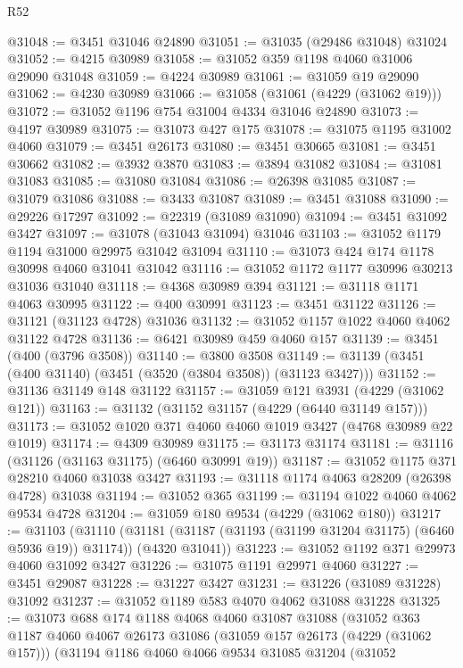 \begin{lexlean}{R52}
\begin{coremodule}
@31048 := @3451 @31046 @24890
@31051 := @31035 (@29486 @31048) @31024
@31052 := @4215 @30989
@31058 := @31052 @359 @1198 @4060 @31006 @29090 @31048
@31059 := @4224 @30989
@31061 := @31059 @19 @29090
@31062 := @4230 @30989
@31066 := @31058 (@31061 (@4229 (@31062 @19)))
@31072 := @31052 @1196 @754 @31004 @4334 @31046 @24890
@31073 := @4197 @30989
@31075 := @31073 @427 @175
@31078 := @31075 @1195 @31002 @4060
@31079 := @3451 @26173
@31080 := @3451 @30665
@31081 := @3451 @30662
@31082 := @3932 @3870
@31083 := @3894 @31082
@31084 := @31081 @31083
@31085 := @31080 @31084
@31086 := @26398 @31085
@31087 := @31079 @31086
@31088 := @3433 @31087
@31089 := @3451 @31088
@31090 := @29226 @17297
@31092 := @22319 (@31089 @31090)
@31094 := @3451 @31092 @3427
@31097 := @31078 (@31043 @31094) @31046
@31103 := @31052 @1179 @1194 @31000 @29975 @31042 @31094
@31110 := @31073 @424 @174 @1178 @30998 @4060 @31041 @31042
@31116 := @31052 @1172 @1177 @30996 @30213 @31036 @31040
@31118 := @4368 @30989 @394
@31121 := @31118 @1171 @4063 @30995
@31122 := @400 @30991
@31123 := @3451 @31122
@31126 := @31121 (@31123 @4728) @31036
@31132 := @31052 @1157 @1022 @4060 @4062 @31122 @4728
@31136 := @6421 @30989 @459 @4060 @157
@31139 := @3451 (@400 (@3796 @3508))
@31140 := @3800 @3508
@31149 := @31139 (@3451 (@400 @31140) (@3451 (@3520 (@3804 @3508)) (@31123 @3427)))
@31152 := @31136 @31149 @148 @31122
@31157 := @31059 @121 @3931 (@4229 (@31062 @121))
@31163 := @31132 (@31152 @31157 (@4229 (@6440 @31149 @157)))
@31173 := @31052 @1020 @371 @4060 @4060 @1019 @3427 (@4768 @30989 @22 @1019)
@31174 := @4309 @30989
@31175 := @31173 @31174
@31181 := @31116 (@31126 (@31163 @31175) (@6460 @30991 @19))
@31187 := @31052 @1175 @371 @28210 @4060 @31038 @3427
@31193 := @31118 @1174 @4063 @28209 (@26398 @4728) @31038
@31194 := @31052 @365
@31199 := @31194 @1022 @4060 @4062 @9534 @4728
@31204 := @31059 @180 @9534 (@4229 (@31062 @180))
@31217 := @31103
    (@31110
      (@31181 (@31187 (@31193 (@31199 @31204 @31175) (@6460 @5936 @19)) @31174))
      (@4320 @31041))
@31223 := @31052 @1192 @371 @29973 @4060 @31092 @3427
@31226 := @31075 @1191 @29971 @4060
@31227 := @3451 @29087
@31228 := @31227 @3427
@31231 := @31226 (@31089 @31228) @31092
@31237 := @31052 @1189 @583 @4070 @4062 @31088 @31228
@31325 := @31073
    @688
    @174
    @1188
    @4068
    @4060
    @31087
    @31088
    (@31052
      @363
      @1187
      @4060
      @4067
      @26173
      @31086
      (@31059 @157 @26173 (@4229 (@31062 @157)))
      (@31194
        @1186
        @4060
        @4066
        @9534
        @31085
        @31204
        (@31052

\end{coremodule}
\end{lexlean}
